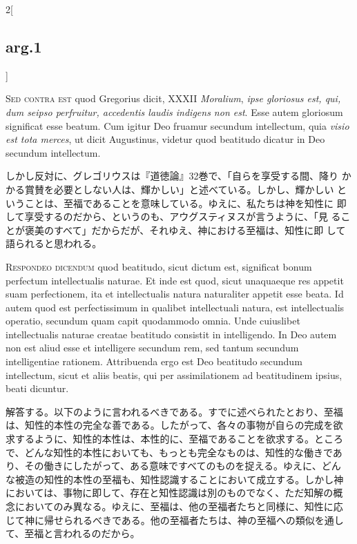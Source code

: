 \documentclass[paper=a4paper,fontsize=10pt,jafontsize=9pt,titlepage]{jlreq}
\begin{document}
\begin{paracol}{2}[\subsection{arg.1}]
\switchcolumn*[\subsection{s.c.}]

{\scshape Sed contra est} quod Gregorius dicit, XXXII {\itshape
Moralium}, {\itshape ipse gloriosus est, qui, dum seipso perfruitur,
accedentis laudis indigens non est}. Esse autem gloriosum significat
esse beatum. Cum igitur Deo fruamur secundum intellectum, quia
{\itshape visio est tota merces}, ut dicit Augustinus, videtur quod
beatitudo dicatur in Deo secundum intellectum.

\switchcolumn

しかし反対に、グレゴリウスは『道徳論』32巻で、「自らを享受する間、降り
かかる賞賛を必要としない人は、輝かしい」と述べている。しかし、輝かしい
ということは、至福であることを意味している。ゆえに、私たちは神を知性に
即して享受するのだから、というのも、アウグスティヌスが言うように、「見
ることが褒美のすべて」だからだが、それゆえ、神における至福は、知性に即
して語られると思われる。


{\scshape Respondeo dicendum} quod beatitudo, sicut dictum est, significat bonum
perfectum intellectualis naturae. Et inde est quod, sicut unaquaeque res
appetit suam perfectionem, ita et intellectualis natura naturaliter
appetit esse beata. Id autem quod est perfectissimum in qualibet
intellectuali natura, est intellectualis operatio, secundum quam capit
quodammodo omnia. Unde cuiuslibet intellectualis naturae creatae
beatitudo consistit in intelligendo. In Deo autem non est aliud esse et
intelligere secundum rem, sed tantum secundum intelligentiae
rationem. Attribuenda ergo est Deo beatitudo secundum intellectum, sicut
et aliis beatis, qui per assimilationem ad beatitudinem ipsius, beati
dicuntur.

\switchcolumn

解答する。以下のように言われるべきである。すでに述べられたとおり、至福
は、知性的本性の完全な善である。したがって、各々の事物が自らの完成を欲
求するように、知性的本性は、本性的に、至福であることを欲求する。ところ
で、どんな知性的本性においても、もっとも完全なものは、知性的な働きであ
り、その働きにしたがって、ある意味ですべてのものを捉える。ゆえに、どん
な被造の知性的本性の至福も、知性認識することにおいて成立する。しかし神
においては、事物に即して、存在と知性認識は別のものでなく、ただ知解の概
念においてのみ異なる。ゆえに、至福は、他の至福者たちと同様に、知性に応
じて神に帰せられるべきである。他の至福者たちは、神の至福への類似を通し
て、至福と言われるのだから。


\end{paracol}
\end{document}
